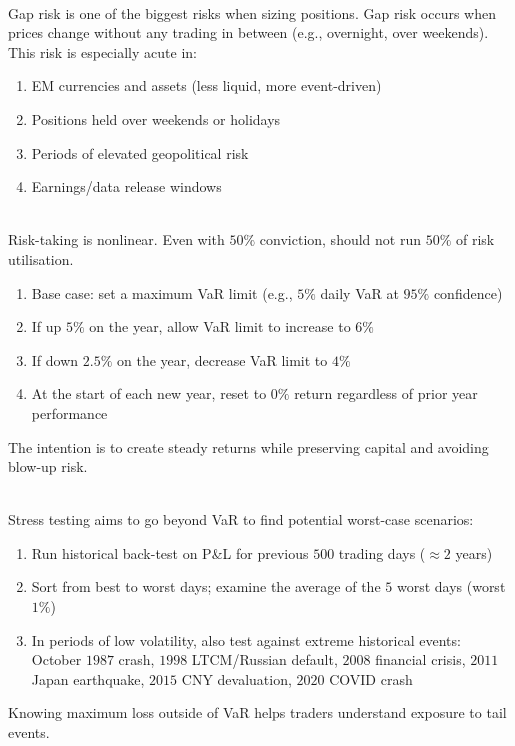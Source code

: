 \begin{remark} \\
Gap risk is one of the biggest risks when sizing positions. Gap risk occurs when prices change without any trading in between (e.g., overnight, over weekends). This risk is especially acute in:
\begin{enumerate}[label=\roman*.]
\setlength{\itemsep}{0pt}
\item EM currencies and assets (less liquid, more event-driven)
\item Positions held over weekends or holidays
\item Periods of elevated geopolitical risk
\item Earnings/data release windows
\end{enumerate}
\end{remark}

\begin{remark} \\
Risk-taking is nonlinear. Even with $50\%$ conviction, should not run $50\%$ of risk utilisation.
\begin{enumerate}[label=\roman*.]
\setlength{\itemsep}{0pt}
\item Base case: set a maximum VaR limit (e.g., $5\%$ daily VaR at $95\%$ confidence)
\item If up $5\% $ on the year, allow VaR limit to increase to $6\%$ 
\item If down $2.5\%$ on the year, decrease VaR limit to $4\%$
\item At the start of each new year, reset to $0\%$ return regardless of prior year performance
\end{enumerate}
The intention is to create steady returns while preserving capital and avoiding blow-up risk.
\end{remark}

\begin{remark} \\
Stress testing aims to go beyond VaR to find potential worst-case scenarios:
\begin{enumerate}[label=\roman*.]
\setlength{\itemsep}{0pt}
\item Run historical back-test on P\&L for previous $500$ trading days ($\approx 2$ years)
\item Sort from best to worst days; examine the average of the $5$ worst days (worst $1\%$)
\item In periods of low volatility, also test against extreme historical events: October $1987$ crash, $1998$ LTCM/Russian default, $2008$ financial crisis, $2011$ Japan earthquake, $2015$ CNY devaluation, $2020$ COVID crash
\end{enumerate}
Knowing maximum loss outside of VaR helps traders understand exposure to tail events.
\end{remark}

